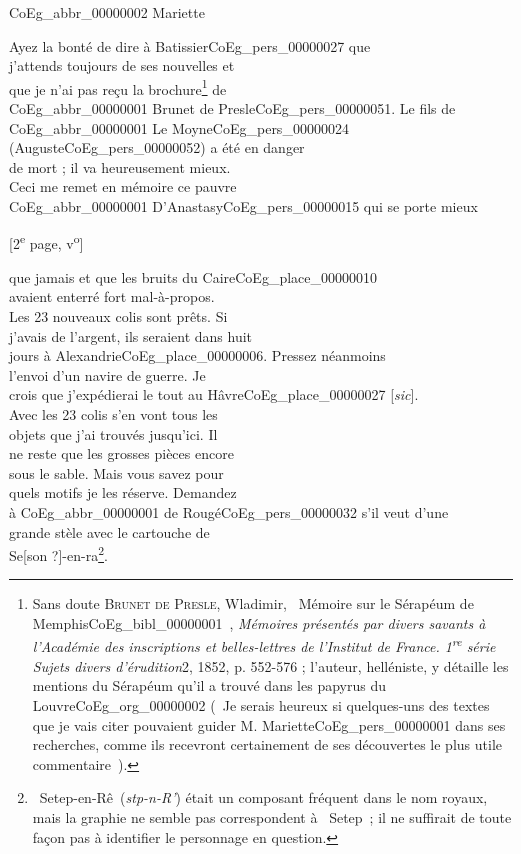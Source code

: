 \documentclass{book}
\begin{document}
\begin{center}\hspace{1cm}\gls{CoEg_abbr_00000002} Mariette\end{center}
Ayez la bonté de dire à Batissier\gls{CoEg_pers_00000027} que\\
j’attends toujours de ses nouvelles et\\
que je n’ai pas reçu la brochure\footnote{Sans doute \textsc{Brunet de Presle}, Wladimir, \og ~Mémoire sur le Sérapéum de Memphis\gls{CoEg_bibl_00000001}~\fg, \textit{Mémoires présentés par divers savants à l'Académie des inscriptions et belles-lettres de l'Institut de France. 1\textsuperscript{re} série Sujets divers d'érudition}2, 1852, p. 552-576 ; l'auteur, helléniste, y détaille les mentions du Sérapéum qu'il a trouvé dans les papyrus du Louvre\gls{CoEg_org_00000002} (\og ~Je serais heureux si quelques-uns des textes que je vais citer pouvaient guider M. Mariette\gls{CoEg_pers_00000001} dans ses recherches, comme ils recevront certainement de ses découvertes le plus utile commentaire~\fg).} de\\
\gls{CoEg_abbr_00000001} Brunet de Presle\gls{CoEg_pers_00000051}. Le fils de\\
\gls{CoEg_abbr_00000001} Le Moyne\gls{CoEg_pers_00000024} (Auguste\gls{CoEg_pers_00000052}) a été en danger\\
de mort ; il va heureusement mieux.\\
Ceci me remet en mémoire ce pauvre\\
\gls{CoEg_abbr_00000001} D’Anastasy\gls{CoEg_pers_00000015} qui se porte mieux
{\footnotesize \begin{center} {[2\textsuperscript{e} page, v\textsuperscript{o}]}\end{center}}
\noindent que jamais et que les bruits du Caire\gls{CoEg_place_00000010}\\
avaient enterré fort mal-à-propos.\\
\indent Les 23 nouveaux colis sont prêts. Si\\
j’avais de l’argent, ils seraient dans huit\\
jours à Alexandrie\gls{CoEg_place_00000006}. Pressez néanmoins\\
l’envoi d’un navire de guerre. Je\\
crois que j’expédierai le tout au Hâvre\gls{CoEg_place_00000027} {[\textit{sic}]}.\\
Avec les 23 colis s’en vont tous les\\
objets que j’ai trouvés jusqu’ici. Il\\
ne reste que les grosses pièces encore\\
sous le sable. Mais vous savez pour\\
quels motifs je les réserve. Demandez\\
à \gls{CoEg_abbr_00000001} de Rougé\gls{CoEg_pers_00000032} s’il veut d’une\\
grande stèle avec le cartouche de\\
Se{[son ?]}-en-ra\footnote{\og ~Setep-en-Rê~\fg (\textit{stp-n-R'}) était un composant fréquent dans le nom royaux, mais la graphie ne semble pas correspondent à \og ~Setep~\fg ; il ne suffirait de toute façon pas à identifier le personnage en question.}.
\end{document}

